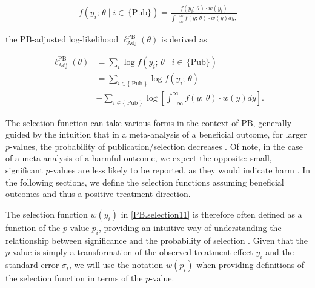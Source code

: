 \documentclass[twocolumn]{article}\usepackage[]{graphicx}\usepackage[]{xcolor}
\begin{document}

\begin{equation}
\label{PB.selection11}
\begin{aligned}
f \left( y_i \text{; } \theta \mid i \in \, \{\text{Pub}\} \right) %
= \frac{f(y_i \text{; } \theta) \cdot w(y_i)}{\int^{+\infty}_{-\infty} f(y \text{; } \theta) \cdot w(y) dy,}
\end{aligned}
\end{equation}


the PB-adjusted log-likelihood $\ell_{\text{Adj}}^{\text{PB}} \left( \theta  \right)$ is derived \citep{selection0, HedgesVev, selection1, selection2} as



\begin{equation*}
\begin{aligned}
\label{lik.PB}
\ell_{\text{Adj}}^{\text{PB}}\left(\theta \right) &= \sum_{i} \log f \left(y_i \text{; } \theta \mid i \in \, \{\text{Pub}\} \right)\\
& = \sum_{i \in \{\operatorname{Pub}\}} \log f(y_i \text{; } \theta) \\
& - \sum_{i \in \{\operatorname{Pub}\}} \log \left[ \int_{-\infty}^{\infty} f(y \text{; } \theta) \cdot w(y)  d y \right] \text{.}
\end{aligned}
\end{equation*}


The selection function can take various forms in the context of PB, generally guided by the intuition that in a meta-analysis of a beneficial outcome, for larger $p$-values, the probability of publication/selection decreases \citep{selection0, HedgesVev, selection1, selection2, selectionWeird, selectionCont, reviewselection}. Of note, in the case of a meta-analysis of a harmful outcome, we expect the opposite: small, significant $p$-values are less likely to be reported, as they would indicate harm \citep{ORBIT_paper, Copas2019}. In the following sections, we define the selection functions assuming beneficial outcomes and thus a positive treatment direction.

The selection function $w(y_i)$ in \eqref{PB.selection11} is therefore often defined as a function of the $p$-value $p_i$, providing an intuitive way of understanding the relationship between significance and the probability of selection \citep{selection1, selection2, reviewselection}. Given that the $p$-value is simply a transformation of the observed treatment effect $y_i$ and the standard error $\sigma_i$, we will use the notation $w(p_i)$ when providing definitions of the selection function in terms of the $p$-value.
\end{document}
